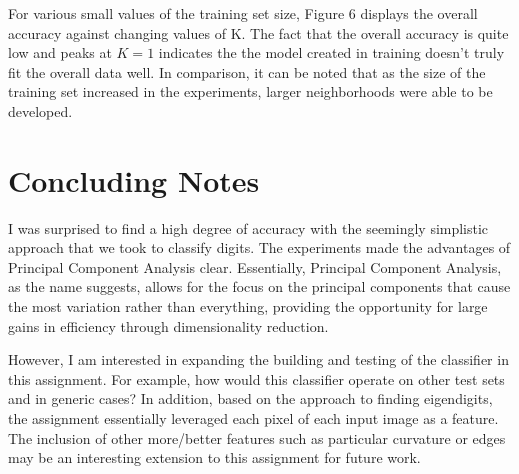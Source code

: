 \documentclass{article} %
\begin{document}
For various small values of the training set size, Figure 6 displays the overall accuracy against changing values of K. The fact that the overall accuracy is quite low and peaks at \(K=1\) indicates the the model created in training doesn't truly fit the overall data well. In comparison, it can be noted that as the size of the training set increased in the experiments, larger neighborhoods were able to be developed. 

\section{Concluding Notes}

I was surprised to find a high degree of accuracy with the seemingly simplistic approach that we took to classify digits. The experiments made the advantages of Principal Component Analysis clear. Essentially, Principal Component Analysis, as the name suggests, allows for the focus on the principal components that cause the most variation rather than everything, providing the opportunity for large gains in efficiency through dimensionality reduction.

However, I am interested in expanding the building and testing of the classifier in this assignment. For example, how would this classifier operate on other test sets and in generic cases? In addition, based on the approach to finding eigendigits, the assignment essentially leveraged each pixel of each input image as a feature. The inclusion of other more/better features such as particular curvature or edges may be an interesting extension to this assignment for future work.
\end{document}
